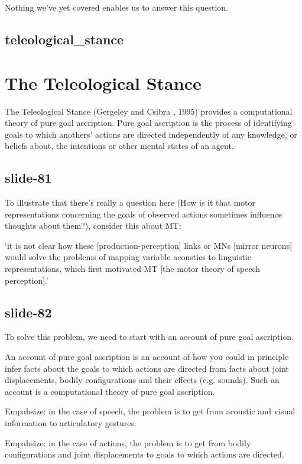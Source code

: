 \documentclass[12pt,\papersize]{extarticle}
\begin{document}
Nothing we’ve yet covered enables us to answer this question.

\subsection{teleological\_stance}


\section{The Teleological Stance}

The Teleological Stance (Gergeley and Csibra , 1995) provides a computational
theory of pure goal ascription.
Pure goal ascription is the process of identifying goals to which anothers’
actions are directed independently of any knowledge, or beliefs about,
the intentions or other mental states of an agent.

\subsection{slide-81}
To illustrate that there’s really a question here (How is it that motor representations concerning
the goals of observed actions sometimes influence thoughts about them?), consider this about MT:

‘it is not clear how these [production-perception] links or MNs [mirror neurons] would solve the
problems of mapping variable acoustics to linguistic representations, which first motivated MT [the
motor theory of speech perception].’
\citep[p.~205]{holt:2014_alluring}

\subsection{slide-82}
To solve this problem, we need to start with an account of pure goal ascription.

An account of pure goal ascription is an account of how you could
in principle infer facts about the goals to which actions are directed from
facts about joint displacements, bodily configurations and their effects
(e.g. sounds).
Such an account is a computational theory of pure goal ascription.

Empahsize: in the case of speech, the problem is to get from acoustic and visual
information to articulatory gestures.

Empahsize: in the case of actions, the problem is to get from bodily configurations
and joint displacements to goals to which actions are directed.
\end{document}
